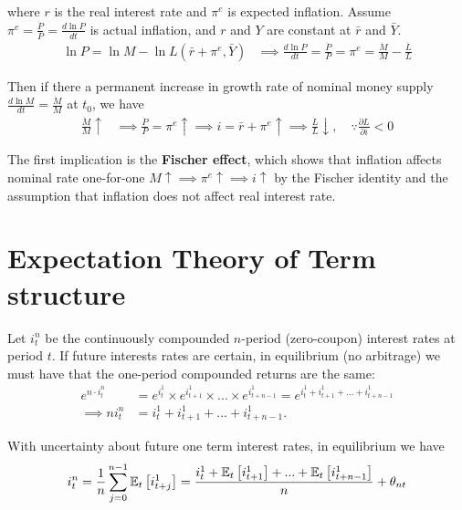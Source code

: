\documentclass[../main.tex]{subfiles}
\begin{document}
        where $r$ is the real interest rate and $\pi^e$ is expected inflation. Assume $\pi^e = \frac{\dot P}{P} = \frac{d \ln P}{d t}$ is actual inflation, and $r$ and $Y$ are constant at $\bar{r}$ and $\bar{Y}$.
        \begin{align}
            \ln P = \ln M - \ln L(\bar r + \pi^e, \bar Y)
            &\implies
            \frac{d \ln{P}}{d t} = \frac{\dot{P}}{P} = \pi^e = \frac{\dot M}{M} - \frac{\dot L}{L}
        \end{align}
        
        Then if there a permanent increase in growth rate of nominal money supply $\frac{d \ln M}{d t} = \frac{\dot{M}}{M}$ at $t_0$, we have
        \begin{align}
            \frac{\dot M}{M} \uparrow
            & \implies
            \frac{\dot P}{P} = \pi^e \uparrow
            \label{eqn:fischer-effect}
            \implies
            i = \bar r + \pi^e \uparrow
            \implies
            \frac{\dot L}{L} \downarrow,
            \quad \because
            \frac{\partial L}{\partial i} < 0
        \end{align}
        
        The first implication is the \textbf{Fischer effect}, which shows that inflation affects nominal rate one-for-one $M \uparrow \implies \pi^e \uparrow \implies i \uparrow$ by the Fischer identity and the assumption that inflation does not affect real interest rate.
        
    \section{Expectation Theory of Term structure}
        
        Let $i_t^n$ be the continuously compounded $n$-period (zero-coupon) interest rates at period $t$. If future interests rates are certain, in equilibrium (no arbitrage) we must have that the one-period compounded returns are the same:
        \begin{align}
            e^{n \cdot i_t^n }
            &= e^{i_t^1 } \times e^{i_{t + 1}^1 } \times ... \times e^{i_{t + n - 1}^1 }
            = e^{i_t^1 + i_{t + 1}^1 + ... + i_{t + n - 1}^1 }
            \\
            \implies
            n i_t^n &= i^1_{t} + i^1_{t+1} + ... + i^1_{t+n-1}.
        \end{align}
        
        With uncertainty about future one term interest rates, in equilibrium we have
        \begin{align}
            i^{n}_t
            = \frac{1}{n} \sum_{j=0}^{n-1} \mathbb{E}_t\left[i^1_{t+j}\right]
            = \frac{i^1_t + \mathbb{E}_t\left[i^1_{t+1}\right] + ... + \mathbb{E}_t\left[i^1_{t+n-1}\right]}{n} + \theta_{nt}
        \end{align}
        
\end{document}
